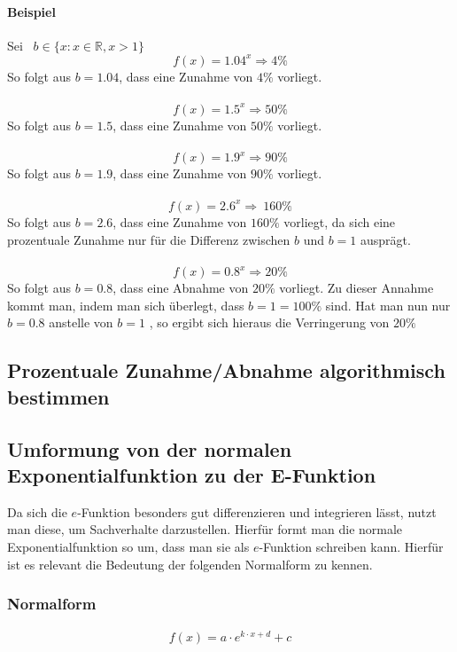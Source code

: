 \paragraph{Beispiel} Sei \ $ b \in\{x : x \in \mathbb{R}, x > 1\}$ \
\[f(x)=1.04^x\Rightarrow4\%\]
So folgt aus $b=1.04$, dass eine Zunahme von $4\%$ vorliegt.\\
\\
\[f(x)=1.5^x\Rightarrow50\%\]
So folgt aus $b=1.5$, dass eine Zunahme von $50\%$ vorliegt.\\
\\
\[f(x)=1.9^x\Rightarrow90\%\]
So folgt aus $b=1.9$, dass eine Zunahme von $90\%$ vorliegt.\\
\\
\[f(x)=2.6^x\Rightarrow\ 160\%\]
So folgt aus $b=2.6$, dass eine Zunahme von $160\%$ vorliegt, da sich eine prozentuale Zunahme nur für die Differenz zwischen $b$ und $b=1$ ausprägt.\\
\\
\[f(x)=0.8^x\Rightarrow20\%\]
So folgt aus $b=0.8$, dass eine Abnahme von $20\%$ vorliegt. Zu dieser Annahme kommt man, indem man sich überlegt, dass $b=1=100\%$ sind. Hat man nun nur $b=0.8$ anstelle von $b=1$ , so ergibt sich hieraus die Verringerung von $20\%$
\pagebreak
\subsection{Prozentuale Zunahme/Abnahme algorithmisch bestimmen}\label{sec:Exponentialfunktionen/Prozentuale Zunahme/Abnahme algorithmisch bestimmen}

\pagebreak
\subsection{Umformung von der normalen Exponentialfunktion zu der E-Funktion}
Da sich die $e$-Funktion besonders gut differenzieren und integrieren lässt, nutzt man diese, um Sachverhalte darzustellen. Hierfür formt man die normale Exponentialfunktion so um, dass man sie als $e$-Funktion schreiben kann. Hierfür ist es relevant die Bedeutung der folgenden Normalform zu kennen. 
\subsubsection{Normalform}
\begin{align*}
	f(x)=a\cdot e^{k\cdot x+d}+c
\end{align*}

